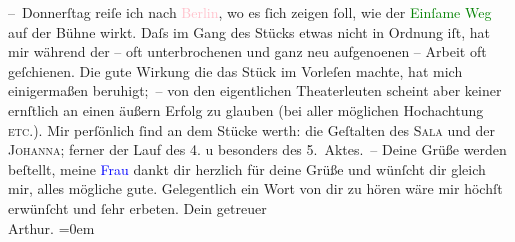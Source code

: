            – Donnerſtag reiſe ich nach \textcolor{pink}{Berlin}{}\ledrightnote{\textcolor{pink}{Berlin}}, wo es ſich
               zeigen ſoll, wie der \textcolor{green}{Einſame Weg}{}\ledrightnote{\textcolor{green}{Der einsame Weg. Schauspiel in fünf Akten}} auf der Bühne
               wirkt. Daſs im Gang des Stücks etwas nicht in Ordnung iſt, hat mir während der – oft
               unterbrochenen und ganz neu aufgeno{\geminationm}enen – Arbeit oft
               geſchienen. Die gute Wirkung {\pb}die das Stück im
               Vorleſen machte, hat mich einigermaßen beruhigt; – von den eigentlichen Theaterleuten
               scheint aber keiner ernſtlich an einen äußern Erfolg zu glauben (bei aller möglichen
               Hochachtung \textsc{etc.}). Mir perſönlich ſind an dem Stücke werth:
               die Geſtalten des \textsc{Sala} und der \textsc{Johanna}; ferner der Lauf des 4. u besonders des 5. Aktes. –\pend
           \pstart
           Deine Grüße werden beſtellt, meine \textcolor{blue}{Frau}{} dankt dir herzlich {\pb}für deine Grüße und
               wünſcht dir gleich mir, alles mögliche gute.\pend
           \pstart
           Gelegentlich ein Wort von dir zu hören wäre mir höchſt erwünſcht und ſehr
               erbeten.\pend
           \pstart
           Dein getreuer{\\[\baselineskip]}\spacefill\mbox{Arthur.}\pend
           \leftskip=0em{}\endnumbering{}  
      